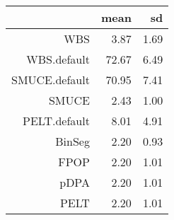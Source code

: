 \begin{tabular}{rrr}
  \hline
 & mean & sd \\ 
  \hline
WBS & 3.87 & 1.69 \\ 
  WBS.default & 72.67 & 6.49 \\ 
  SMUCE.default & 70.95 & 7.41 \\ 
  SMUCE & 2.43 & 1.00 \\ 
  PELT.default & 8.01 & 4.91 \\ 
  BinSeg & 2.20 & 0.93 \\ 
  FPOP & 2.20 & 1.01 \\ 
  pDPA & 2.20 & 1.01 \\ 
  PELT & 2.20 & 1.01 \\ 
   \hline
\end{tabular}
